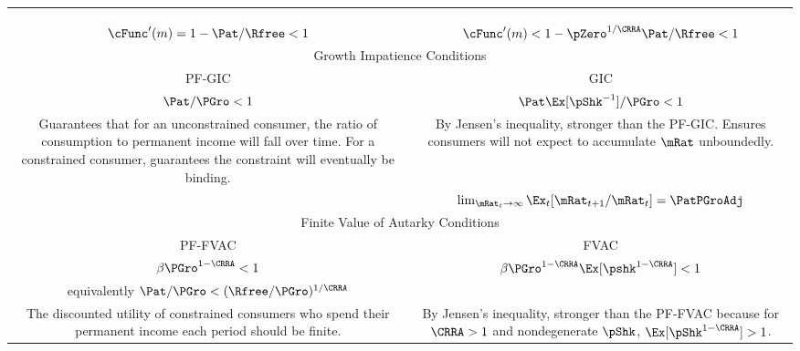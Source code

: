 \begin{table}[!th]
\begin{center}
\begin{tabular}{|c|c|}
& \\
& \\
& \\
$\cFunc^{\prime}(m) = 1-\Pat/\Rfree < 1$              & $\cFunc^{\prime}(m) < 1-\pZero^{1/\CRRA}\Pat/\Rfree < 1$
\\ \hline
\multicolumn{2}{|c|}{Growth Impatience Conditions} \\ \hline
\multicolumn{1}{|c|}{PF-GIC} & \multicolumn{1}{c|}{GIC} \\ \hline
$\Pat/\PGro < 1$                                         & $\Pat\Ex[\pShk^{-1}]/\PGro < 1 $ \\
\multirow{4}{75mm}{Guarantees that for an unconstrained consumer, the ratio of consumption to permanent income will fall over time.  For a constrained consumer, guarantees the constraint will eventually be binding.} &
\multirow{4}{75mm}{By Jensen's inequality, stronger than the PF-GIC.  Ensures consumers will not expect to accumulate $\mRat$ unboundedly.} \\
& \\
& \\
& \\
& $\lim_{\mRat_{t} \rightarrow \infty} \Ex_{t}[\mRat_{t+1}/\mRat_{t}] = \PatPGroAdj $
 \\ \hline
\multicolumn{2}{|c|}{Finite Value of Autarky Conditions} \\ \hline
\multicolumn{1}{|c|}{PF-FVAC} & \multicolumn{1}{c|}{FVAC} \\ \hline
$\beta \PGro^{1-\CRRA} < 1$                                                 & $\beta \PGro^{1-\CRRA}\Ex[\pshk^{1-\CRRA}] < 1$  \\
equivalently $\Pat/\PGro  < (\Rfree/\PGro)^{1/\CRRA}$ & \\
\multirow{3}{75mm}{The discounted utility of constrained consumers who spend their permanent income each period should be finite.} &
\multirow{3}{75mm}{By Jensen's inequality, stronger than the PF-FVAC because for $\CRRA>1$ and nondegenerate $\pShk$, $\Ex[\pShk^{1-\CRRA}] > 1$.}  \\
& \\
& \\ \hline
\end{tabular}
\end{center}
\end{table}
\clearpage
